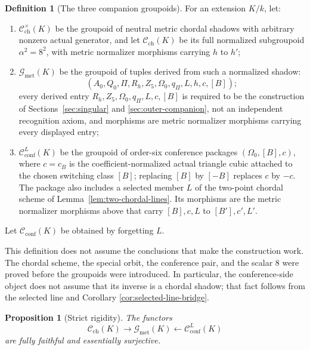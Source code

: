 \documentclass[11pt]{article}
\newtheorem{proposition}[theorem]{Proposition}
\theoremstyle{definition}
\newtheorem{definition}[theorem]{Definition}
\theoremstyle{remark}
\newcommand{\cC}{\mathscr C}
\newcommand{\cG}{\mathscr G}
\begin{document}
\begin{definition}[The three companion groupoids]
\label{def:three-groupoids}
For an extension \(K/k\), let:
\begin{enumerate}[label=\textup{(\alph*)},leftmargin=2.4em]
\item \(\cC_{\mathrm{ch}}^\times(K)\) be the groupoid of neutral metric
  chordal shadows with arbitrary nonzero actual generator, and let
  \(\cC_{\mathrm{ch}}(K)\) be its full normalized subgroupoid
  \(\alpha^2=8^2\), with metric normalizer morphisms carrying \(h\) to
  \(h'\);
\item \(\cG_{\mathrm{met}}(K)\) be the groupoid of tuples derived from such a
  normalized shadow:
  \[
  (A_0,Q_0,\Pi,R_h,Z_5,\Omega_0,q_\Pi,L,h,c,[B]);
  \]
  every derived entry \(R_h,Z_5,\Omega_0,q_\Pi,L,c,[B]\) is required to be
  the construction of Sections~\ref{sec:singular} and
  \ref{sec:outer-companion}, not an
  independent recognition axiom, and morphisms are metric normalizer
  morphisms carrying every displayed entry;
\item \(\cC_{\mathrm{conf}}^L(K)\) be the groupoid of order-six
  conference packages \((\Omega_0,[B],c)\), where \(c=c_B\) is the
  coefficient-normalized actual triangle cubic attached to the chosen
  switching class \([B]\); replacing \([B]\) by \([-B]\) replaces \(c\) by
  \(-c\).  The package also includes a selected member
  \(L\) of the two-point chordal scheme of
  Lemma~\ref{lem:two-chordal-lines}.  Its morphisms are the metric normalizer
  morphisms above that carry \([B],c,L\) to \([B'],c',L'\).
\end{enumerate}
Let \(\cC_{\mathrm{conf}}(K)\) be obtained by forgetting \(L\).
\end{definition}

This definition does not assume the conclusions that make the construction
work.  The chordal scheme, the special orbit, the conference pair, and the
scalar \(8\) were proved before the groupoids were introduced.  In
particular, the conference-side object does not assume that its inverse is a
chordal shadow; that fact follows from the selected line and Corollary
\ref{cor:selected-line-bridge}.

\begin{proposition}[Strict rigidity]
\label{prop:strict-rigidity}
The functors
\[
 \cC_{\mathrm{ch}}(K)\longrightarrow\cG_{\mathrm{met}}(K)
 \longleftarrow\cC_{\mathrm{conf}}^L(K)
\]
are fully faithful and essentially surjective.
\end{proposition}
\end{document}
